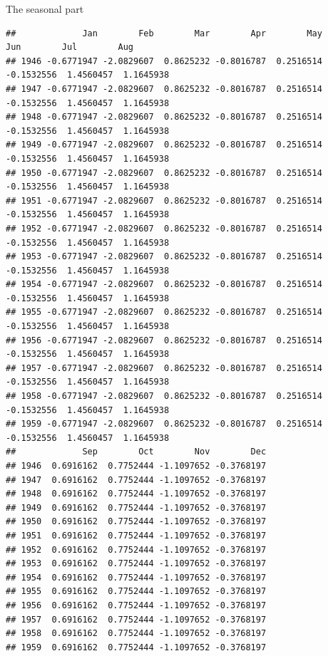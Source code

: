 \documentclass[ignorenonframetext,]{beamer}
\begin{document}
\begin{frame}[fragile]{The seasonal part}
\begin{verbatim}
##             Jan        Feb        Mar        Apr        May        Jun        Jul        Aug
## 1946 -0.6771947 -2.0829607  0.8625232 -0.8016787  0.2516514 -0.1532556  1.4560457  1.1645938
## 1947 -0.6771947 -2.0829607  0.8625232 -0.8016787  0.2516514 -0.1532556  1.4560457  1.1645938
## 1948 -0.6771947 -2.0829607  0.8625232 -0.8016787  0.2516514 -0.1532556  1.4560457  1.1645938
## 1949 -0.6771947 -2.0829607  0.8625232 -0.8016787  0.2516514 -0.1532556  1.4560457  1.1645938
## 1950 -0.6771947 -2.0829607  0.8625232 -0.8016787  0.2516514 -0.1532556  1.4560457  1.1645938
## 1951 -0.6771947 -2.0829607  0.8625232 -0.8016787  0.2516514 -0.1532556  1.4560457  1.1645938
## 1952 -0.6771947 -2.0829607  0.8625232 -0.8016787  0.2516514 -0.1532556  1.4560457  1.1645938
## 1953 -0.6771947 -2.0829607  0.8625232 -0.8016787  0.2516514 -0.1532556  1.4560457  1.1645938
## 1954 -0.6771947 -2.0829607  0.8625232 -0.8016787  0.2516514 -0.1532556  1.4560457  1.1645938
## 1955 -0.6771947 -2.0829607  0.8625232 -0.8016787  0.2516514 -0.1532556  1.4560457  1.1645938
## 1956 -0.6771947 -2.0829607  0.8625232 -0.8016787  0.2516514 -0.1532556  1.4560457  1.1645938
## 1957 -0.6771947 -2.0829607  0.8625232 -0.8016787  0.2516514 -0.1532556  1.4560457  1.1645938
## 1958 -0.6771947 -2.0829607  0.8625232 -0.8016787  0.2516514 -0.1532556  1.4560457  1.1645938
## 1959 -0.6771947 -2.0829607  0.8625232 -0.8016787  0.2516514 -0.1532556  1.4560457  1.1645938
##             Sep        Oct        Nov        Dec
## 1946  0.6916162  0.7752444 -1.1097652 -0.3768197
## 1947  0.6916162  0.7752444 -1.1097652 -0.3768197
## 1948  0.6916162  0.7752444 -1.1097652 -0.3768197
## 1949  0.6916162  0.7752444 -1.1097652 -0.3768197
## 1950  0.6916162  0.7752444 -1.1097652 -0.3768197
## 1951  0.6916162  0.7752444 -1.1097652 -0.3768197
## 1952  0.6916162  0.7752444 -1.1097652 -0.3768197
## 1953  0.6916162  0.7752444 -1.1097652 -0.3768197
## 1954  0.6916162  0.7752444 -1.1097652 -0.3768197
## 1955  0.6916162  0.7752444 -1.1097652 -0.3768197
## 1956  0.6916162  0.7752444 -1.1097652 -0.3768197
## 1957  0.6916162  0.7752444 -1.1097652 -0.3768197
## 1958  0.6916162  0.7752444 -1.1097652 -0.3768197
## 1959  0.6916162  0.7752444 -1.1097652 -0.3768197
\end{verbatim}

\normalsize

\end{frame}
\end{document}
